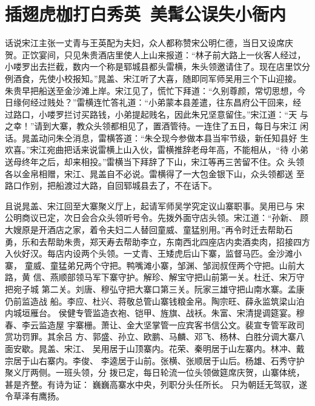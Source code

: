 \chapter{插翅虎枷打白秀英~美髯公误失小衙内}

话说宋江主张一丈青与王英配为夫妇，众人都称赞宋公明仁德，当日又设席庆
贺。正饮宴间，只见朱贵酒店里使人上山来报道：“林子前大路上一伙客人经过，
小喽罗出去拦截，数内一个称是郓城县都头雷横，朱头领邀请住了。现在店里饮分
例酒食，先使小校报知。”晁盖、宋江听了大喜，随即同军师吴用三个下山迎接。
朱贵早把船送至金沙滩上岸。宋江见了，慌忙下拜道：“久别尊颜，常切思想，今
日缘何经过贱处？”雷横连忙答礼道：“小弟蒙本县差遣，往东昌府公干回来，经
过路口，小喽罗拦讨买路钱，小弟提起贱名，因此朱兄坚意留住。”宋江道：“天
与之幸！”请到大寨，教众头领都相见了，置酒管待。一连住了五日，每日与宋江
闲话。晁盖动问朱仝消息，雷横答道：“朱仝现今参做本县当牢节级，新任知县好
生欢喜。”宋江宛曲把话来说雷横上山入伙，雷横推辞老母年高，不能相从，“待
小弟送母终年之后，却来相投。”雷横当下拜辞了下山，宋江等再三苦留不住。众
头领各以金帛相赠，宋江、晁盖自不必说。雷横得了一大包金银下山，众头领都送
至路口作别，把船渡过大路，自回郓城县去了，不在话下。

且说晁盖、宋江回至大寨聚义厅上，起请军师吴学究定议山寨职事。吴用已与
宋公明商议已定，次日会合众头领听号令。先拨外面守店头领。宋江道：“孙新、
顾大嫂原是开酒店之家，着令夫妇二人替回童威、童猛别用。”再令时迁去帮助石
勇，乐和去帮助朱贵，郑天寿去帮助李立，东南西北四座店内卖酒卖肉，招接四方
入伙好汉。每店内设两个头领。一丈青、王矮虎后山下寨，监督马匹。金沙滩小寨，
童威、童猛弟兄两个守把。鸭嘴滩小寨，邹渊、邹润叔侄两个守把。山前大路，黄
信、燕顺部领马军下寨守护。解珍、解宝守把山前第一关。杜迁、宋万守把宛子城
第二关。刘唐、穆弘守把大寨口第三关。阮家三雄守把山南水寨。孟康仍前监造战
船。李应、杜兴、蒋敬总管山寨钱粮金帛。陶宗旺、薛永监筑梁山泊内城垣雁台。
侯健专管监造衣袍、铠甲、旌旗、战袄。朱富、宋清提调筵宴。穆春、李云监造屋
宇寨栅。萧让、金大坚掌管一应宾客书信公文。裴宣专管军政司赏功罚罪。其余吕
方、郭盛、孙立、欧鹏、马麟、邓飞、杨林、白胜分调大寨八面安歇。晁盖、宋江、
吴用居于山顶寨内。花荣、秦明居于山左寨内。林冲、戴宗居于山右寨内。李俊、
李逵居于山前。张横、张顺居于山后。杨雄、石秀守护聚义厅两侧。一班头领，分
拨已定，每日轮流一位头领做筵席庆贺，山寨体统，甚是齐整。有诗为证：
巍巍高寨水中央，列职分头任所长。
只为朝廷无驾驭，遂令草泽有鹰扬。

